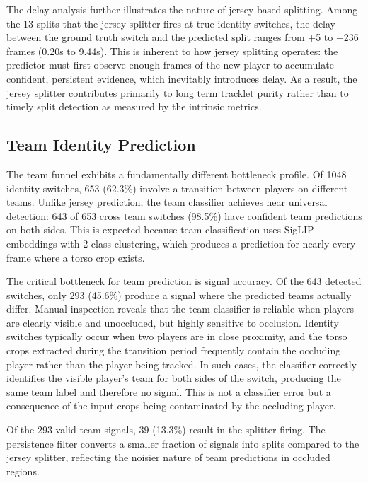 The delay analysis further illustrates the nature of jersey based splitting. Among the 13 splits that the jersey splitter fires at true identity switches, the delay between the ground truth switch and the predicted split ranges from +5 to +236 frames (0.20s to 9.44s). This is inherent to how jersey splitting operates: the predictor must first observe enough frames of the new player to accumulate confident, persistent evidence, which inevitably introduces delay. As a result, the jersey splitter contributes primarily to long term tracklet purity rather than to timely split detection as measured by the intrinsic metrics.

\subsection{Team Identity Prediction}\label{subsec:team-prediction-quality}

The team funnel exhibits a fundamentally different bottleneck profile. Of 1048 identity switches, 653 (62.3\%) involve a transition between players on different teams. Unlike jersey prediction, the team classifier achieves near universal detection: 643 of 653 cross team switches (98.5\%) have confident team predictions on both sides. This is expected because team classification uses SigLIP embeddings with 2 class clustering, which produces a prediction for nearly every frame where a torso crop exists.

The critical bottleneck for team prediction is signal accuracy. Of the 643 detected switches, only 293 (45.6\%) produce a signal where the predicted teams actually differ. Manual inspection reveals that the team classifier is reliable when players are clearly visible and unoccluded, but highly sensitive to occlusion. Identity switches typically occur when two players are in close proximity, and the torso crops extracted during the transition period frequently contain the occluding player rather than the player being tracked. In such cases, the classifier correctly identifies the visible player's team for both sides of the switch, producing the same team label and therefore no signal. This is not a classifier error but a consequence of the input crops being contaminated by the occluding player.

Of the 293 valid team signals, 39 (13.3\%) result in the splitter firing. The persistence filter converts a smaller fraction of signals into splits compared to the jersey splitter, reflecting the noisier nature of team predictions in occluded regions.

